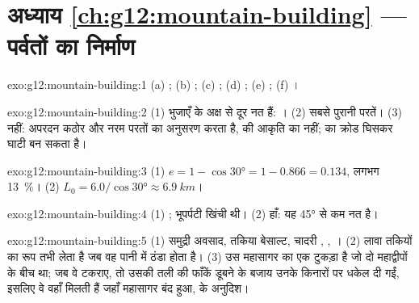 \section*{अध्याय \ref{ch:g12:mountain-building} --- पर्वतों का निर्माण}

\begin{solution}{exo:g12:mountain-building:1}
(a) ; (b) ; (c) ; (d) ; (e) ;
(f) ।
\end{solution}

\begin{solution}{exo:g12:mountain-building:2}
(1) भुजाएँ  के अक्ष से दूर नत हैं: । (2) सबसे पुरानी
परतें। (3) नहीं: अपरदन कठोर और नरम परतों का अनुसरण करता है,  की
आकृति का नहीं;  का क्रोड घिसकर घाटी बन सकता है।
\end{solution}

\begin{solution}{exo:g12:mountain-building:3}
(1) $e = 1 - \cos\ang{30} = 1 - 0.866 = 0.134$, लगभग \qty{13}{\percent}।
(2) $L_0 = 6.0/\cos\ang{30} \approx \qty{6.9}{km}$।
\end{solution}

\begin{solution}{exo:g12:mountain-building:4}
(1) ; भूपर्पटी खिंची थी। (2) हाँ: यह \ang{45} से कम नत
 है।
\end{solution}

\begin{solution}{exo:g12:mountain-building:5}
(1) समुद्री अवसाद, तकिया बेसाल्ट, चादरी , , ।
(2) लावा तकियों का रूप तभी लेता है जब वह पानी में ठंडा होता है। (3) 
उस महासागर का एक टुकड़ा है जो दो महाद्वीपों के बीच था; जब वे टकराए,
तो उसकी तली की फाँकें डूबने के बजाय उनके किनारों पर धकेल दी गईं, इसलिए वे
वहाँ मिलती हैं जहाँ महासागर बंद हुआ,  के अनुदिश।
\end{solution}

